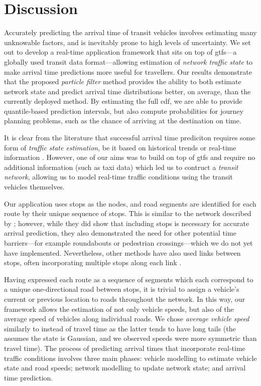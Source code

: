 \chapter{Discussion}
\label{cha:discussion}


Accurately predicting the arrival time of transit vehicles involves estimating many unknowable factors, and is inevitably prone to high levels of uncertainty. We set out to develop a real-time application framework that sits on top of \gls{gtfs}---a globally used transit data format---allowing estimation of \emph{network traffic state} to make arrival time predictions more useful for travellers. Our results demonstrate that the proposed \emph{particle filter} method provides the ability to both estimate network state and predict arrival time distributions better, on average, than the currently deployed method. By estimating the full \gls{cdf}, we are able to provide quantile-based prediction intervals, but also compute probabilities for journey planning problems, such as the chance of arriving at the destination on time.


It is clear from the literature that successful arrival time prediciton requires some form of \emph{traffic state estimation}, be it based on historical trends \citep{Julio_2016,Cathey_2003,Celan_2017,Mazloumi_2012} or real-time information \citep{Ma_2019,Xinghao_2013,Shalaby_2004}. However, one of our aims was to build on top of \gls{gtfs} and require no additional information (such as taxi data) which led us to contruct a \emph{transit network}, allowing us to model real-time traffic conditions using the transit vehicles themselves.


Our application uses stops as the nodes, and road segments are identified for each route by their unique sequence of stops. This is similar to the network described by \citet{Celan_2018,Celan_2017}; however, while they did show that including stops is necessary for accurate arrival prediction, they also demonstrated the need for other potential time barriers---for example roundabouts or pedestrian crossings---which we do not yet have implemented. Nevertheless, other methods have also used links between stops, often incorporating multiple stops along each link \citep{Shalaby_2004}.


Having expressed each route as a sequence of segments which each correspond to a unique one-directional road between stops, it is trivial to assign a vehicle's current or previous location to roads throughout the network. In this way, our framework allows the estimation of not only vehicle speeds, but also of the average speed of vehicles along individual roads. We chose \emph{average vehicle speed} similarly to \citet{Celan_2017,Celan_2018} instead of travel time \citep{Shalaby_2004,Dai_2019} as the latter tends to have long tails (the \kf{} assumes the state is Gaussian, and we observed speeds were more symmetric than travel time). The process of predicting arrival times that incorporate real-time traffic conditions involves three main phases: vehicle modelling to estimate vehicle state and road speeds; network modelling to update network state; and arrival time prediction.


